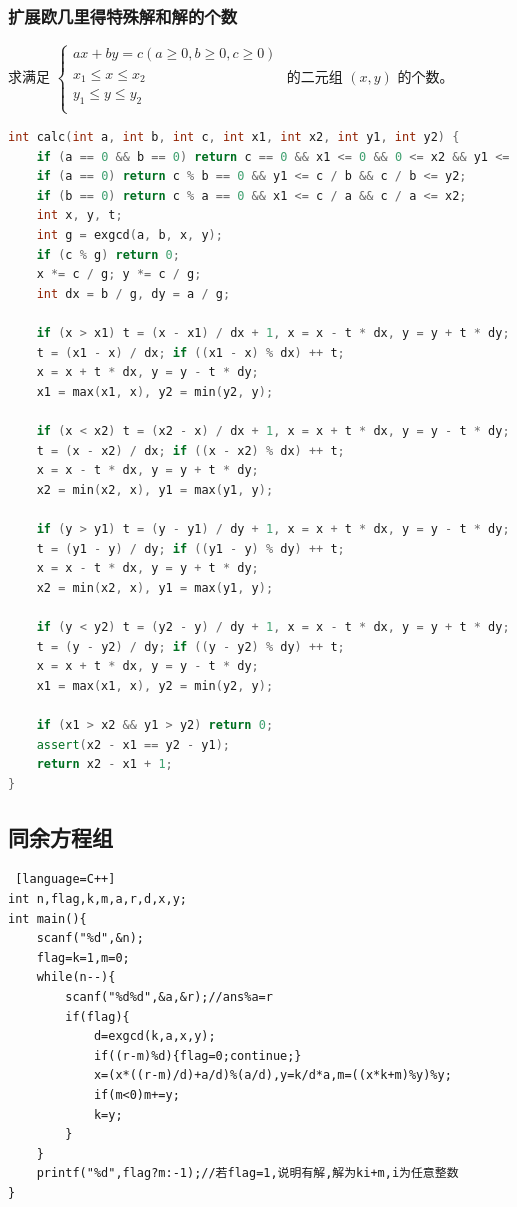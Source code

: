 \documentclass{article}
\begin{document}
\subsubsection{扩展欧几里得特殊解和解的个数}

求满足
$
\left\{
\begin{array}{l}
	ax + by = c (a \geq 0, b \geq 0, c \geq 0)\\
	x_1 \leq x \leq x_2 \\
	y_1 \leq y \leq y_2 \\
\end{array}
\right.
$
的二元组 $(x, y)$ 的个数。 \\

\begin{lstlisting}[language=C++]
int calc(int a, int b, int c, int x1, int x2, int y1, int y2) {
	if (a == 0 && b == 0) return c == 0 && x1 <= 0 && 0 <= x2 && y1 <= 0 && 0 <= y2;
	if (a == 0) return c % b == 0 && y1 <= c / b && c / b <= y2;
	if (b == 0) return c % a == 0 && x1 <= c / a && c / a <= x2;
	int x, y, t;
	int g = exgcd(a, b, x, y);
	if (c % g) return 0;
	x *= c / g; y *= c / g;
	int dx = b / g, dy = a / g;

	if (x > x1) t = (x - x1) / dx + 1, x = x - t * dx, y = y + t * dy;
	t = (x1 - x) / dx; if ((x1 - x) % dx) ++ t;
	x = x + t * dx, y = y - t * dy;
	x1 = max(x1, x), y2 = min(y2, y);

	if (x < x2) t = (x2 - x) / dx + 1, x = x + t * dx, y = y - t * dy;
	t = (x - x2) / dx; if ((x - x2) % dx) ++ t;
	x = x - t * dx, y = y + t * dy;
	x2 = min(x2, x), y1 = max(y1, y);

	if (y > y1) t = (y - y1) / dy + 1, x = x + t * dx, y = y - t * dy;
	t = (y1 - y) / dy; if ((y1 - y) % dy) ++ t;
	x = x - t * dx, y = y + t * dy;
	x2 = min(x2, x), y1 = max(y1, y);

	if (y < y2) t = (y2 - y) / dy + 1, x = x - t * dx, y = y + t * dy;
	t = (y - y2) / dy; if ((y - y2) % dy) ++ t;
	x = x + t * dx, y = y - t * dy;
	x1 = max(x1, x), y2 = min(y2, y);

	if (x1 > x2 && y1 > y2) return 0;
	assert(x2 - x1 == y2 - y1);
	return x2 - x1 + 1;
}
\end{lstlisting}

\subsection{同余方程组}
\begin{lstlisting} [language=C++]
int n,flag,k,m,a,r,d,x,y;
int main(){
	scanf("%d",&n);
	flag=k=1,m=0;
	while(n--){
		scanf("%d%d",&a,&r);//ans%a=r
		if(flag){
			d=exgcd(k,a,x,y);
			if((r-m)%d){flag=0;continue;}
			x=(x*((r-m)/d)+a/d)%(a/d),y=k/d*a,m=((x*k+m)%y)%y;
			if(m<0)m+=y;
			k=y;
		}
	}
	printf("%d",flag?m:-1);//若flag=1,说明有解,解为ki+m,i为任意整数
}
\end{lstlisting}
\end{document}
